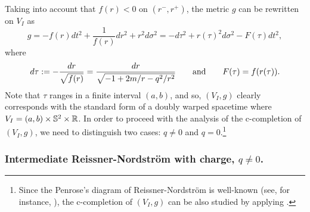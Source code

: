 Taking into account that $f(r)<0$ on $(r^-,r^+)$, the metric $g$ can be rewritten on $V_I$ as
\begin{equation}
  \label{eq:37}
g= -f(r)dt^2 + \frac{1}{f(r)}dr^2 + r^2 d\sigma^2=-d\tau^2 + r(\tau)^2d\sigma^2-F(\tau)dt^2,
\end{equation}
where
\[
d\tau:=-\frac{dr}{\sqrt{f(r)}}=\frac{dr}{\sqrt{-1+2m/r-q^2/r^2}} \qquad \hbox{and}\qquad F(\tau)=f(r(\tau)).
\]
Note that $\tau$ ranges in a finite interval $(a,b)$, and so, $(V_I,g)$ clearly corresponds with the standard form of a doubly warped spacetime where $V_I=(a,b)\times\mathbb{S}^2\times {\mathbb R}$.
In order to proceed with the analysis of the c-completion of $(V_I,g)$, we need to distinguish two cases: $q\neq 0$ and $q=0$.\footnote{Since the Penrose's diagram of Reissner-Nordstr\"om is well-known (see, for instance, \cite{hawking1975large}), the c-completion of $(V_I,g)$ can be also studied by applying \cite[Thm. 4.32]{FHSFinalDef}.}
%
%


\subsubsection*{Intermediate Reissner-Nordstr\"om with charge, $q\neq 0$.}

